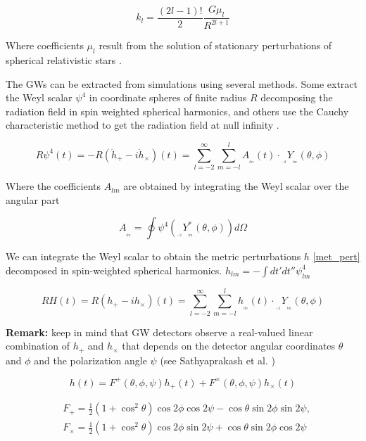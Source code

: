 \begin{equation}
k_l = \frac{(2l-1)!}{2}\frac{G \mu_l}{R^{2l+1}}
\end{equation}

Where coefficients $\mu_l$ result from the solution of stationary perturbations of spherical relativistic stars \cite{PhysRevD.80.084035,PhysRevD.80.084018,PhysRevD.77.021502,2020GReGr..52..108B}.

The GWs can be extracted from simulations using several methods. Some extract the Weyl scalar $\psi^4$ in coordinate spheres of finite radius $R$ \cite{Bishop:2016lgv,Thorne:1980ru} decomposing the radiation field in spin weighted spherical harmonics, and others use the Cauchy characteristic method to get the radiation field at null infinity \cite{Barkett:2019uae}.

\begin{equation}\label{pso}
R\psi^4(t) = - R(\ddot{h}_+ - i\ddot{h}_\times)(t) = \sum_{l=-2}^{\infty}  \sum_{m=-l}^{l} A_{_{_{lm}}}(t) \cdot {}_{_{_{-2}}}Y_{_{_{lm}}}(\theta, \phi)
\end{equation}

Where the coefficients $A_{lm}$ are obtained by integrating the Weyl scalar over the angular  part

\begin{equation}
A_{_{_{lm}}} = \oint \psi^4({}_{_{_{-2}}}Y^{*}_{_{_{lm}}}(\theta, \phi)) d\Omega
\end{equation}

We can integrate the Weyl scalar to obtain the metric perturbations $h$ \ref{met_pert} decomposed in spin-weighted spherical harmonics.
$ h_{lm} = - \int dt' dt'' \psi_{lm}^4$
 
\begin{equation}\label{fvr}
RH(t) = R(h_+ - ih_{\times})(t) = \sum_{l=-2}^{\infty}  \sum_{m=-l}^{l} h_{_{_{lm}}}(t) \cdot {}_{_{_{-2}}}Y_{_{_{lm}}}(\theta, \phi)
\end{equation}

\begin{mdframed}
\textbf{Remark:} keep in mind that  GW detectors observe a real-valued linear combination of $h_+$ and $h_\times$ that depends on the detector angular coordinates $\theta$ and $\phi$  and the polarization angle $\psi$ (see Sathyaprakash et al. \cite[section 4.2.1]{Sathyaprakash:2009xs})

\begin{equation}
h(t) = F^{+}(\theta, \phi, \psi) h_+(t) + F^{\times}(\theta, \phi, \psi) h_{\times}(t)
\end{equation}

\begin{equation}
\begin{aligned}
& F_{+}=\frac{1}{2}\left(1+\cos ^2 \theta\right) \cos 2 \phi \cos 2 \psi-\cos \theta \sin 2 \phi \sin 2 \psi, \\
& F_{\times}=\frac{1}{2}\left(1+\cos ^2 \theta\right) \cos 2 \phi \sin 2 \psi+\cos \theta \sin 2 \phi \cos 2 \psi
\end{aligned}
\end{equation}
\end{mdframed}


